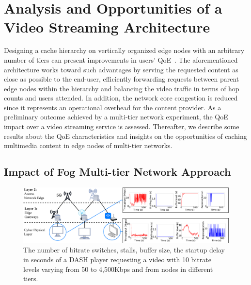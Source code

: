 \section{Analysis and Opportunities of a Video Streaming Architecture}
\label{sec:system-archi}


Designing a cache hierarchy on vertically organized edge nodes with an arbitrary number of tiers can present improvements in users’ QoE~\cite{rana2018vertical}. The aforementioned architecture works toward such advantages by serving the requested content as close as possible to the end-user, efficiently forwarding requests between parent edge nodes within the hierarchy and balancing the video traffic in terms of hop counts and users attended. In addition, the network core congestion is reduced since it represents an operational overhead for the content provider.
As a preliminary outcome achieved by a multi-tier network experiment, the QoE impact over a video streaming service is assessed. Thereafter, we describe some results about the QoE characteristics and insights on the opportunities of caching multimedia content in edge nodes of multi-tier networks.

\subsection{Impact of Fog Multi-tier Network Approach}

\begin{figure}
    \centering
    \includegraphics[width=\linewidth]{images/qoe-multi-level-3.pdf}
    \caption{The number of bitrate switches, stalls, buffer size, the startup delay in seconds of a DASH player requesting a video with 10 bitrate levels varying from 50 to 4,500Kbps and from nodes in different tiers.}
    \label{fig:impact-two-layers}
\end{figure}

